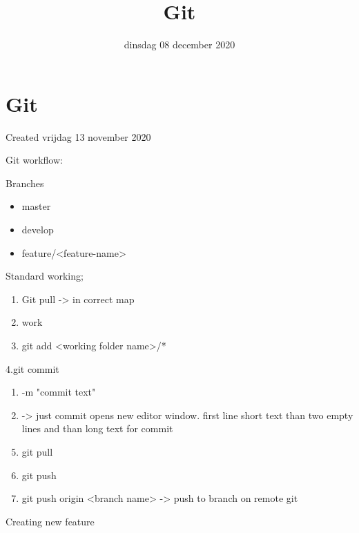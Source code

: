 \documentclass{scrartcl}
\title{Git}
\date{dinsdag 08 december 2020}
\author{}
\begin{document}
\maketitle

		\section{Git}

Created vrijdag 13 november 2020



Git workflow:



Branches

\begin{itemize}
\item master
\item develop
\item feature/\textless{}feature-name\textgreater{}
\end{itemize}


Standard working;

\begin{enumerate}[1]
\item Git pull -\textgreater{} in correct map
\item work
\item git add \textless{}working folder name\textgreater{}/*
\end{enumerate}
4.git commit

	\begin{enumerate}[a]
	\item -m "commit text"
	\item -\textgreater{} just commit opens new editor window. first line short text than two empty lines and than long text for commit
	\end{enumerate}
\begin{enumerate}[1]
\setcounter{enumi}{4}
\item git pull
\item git push
\item git push origin \textless{}branch name\textgreater{} -\textgreater{} push to branch on remote git
\end{enumerate}


Creating new feature
\end{document}
